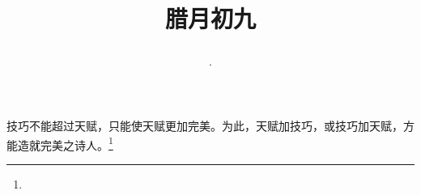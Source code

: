 \title{\date[d=19,m=1,y=2024][year:cn-y,年,month:cn,day:cn,日,·,weekday]·腊月初九 }
技巧不能超过天赋，只能使天赋更加完美。为此，天赋加技巧，或技巧加天赋，方能造就完美之诗人。\footnote{ }

